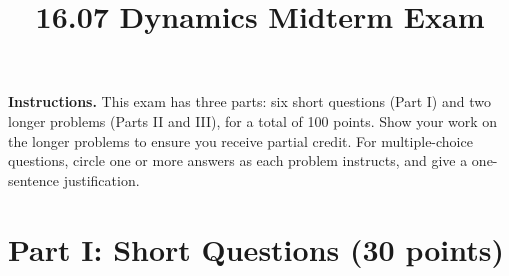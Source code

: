 \documentclass[11pt,letterpaper]{article}
\title{16.07 Dynamics Midterm Exam}
\author{}
\date{}
\begin{document}
\maketitle
\vspace{-1.5cm}

\noindent\textbf{Instructions.} This exam has three parts: six short questions (Part I) and two longer problems (Parts II and III), for a total of 100 points. Show your work on the longer problems to ensure you receive partial credit. For multiple-choice questions, circle one or more answers as each problem instructs, and give a one-sentence justification.


\section*{Part I: Short Questions \hfill (30 points)}
\end{document}
